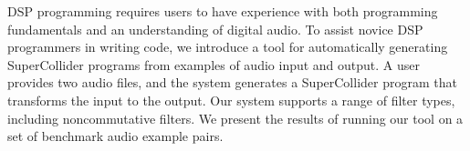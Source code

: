 DSP programming requires users to have experience with both programming fundamentals and an understanding of digital audio.
To assist novice DSP programmers in writing code, we introduce a tool for automatically generating SuperCollider programs from examples of audio input and output.
A user provides two audio files, and the system generates a SuperCollider program that transforms the input to the output.
Our system supports a range of filter types, including noncommutative filters.
We present the results of running our tool on a set of benchmark audio example pairs.
